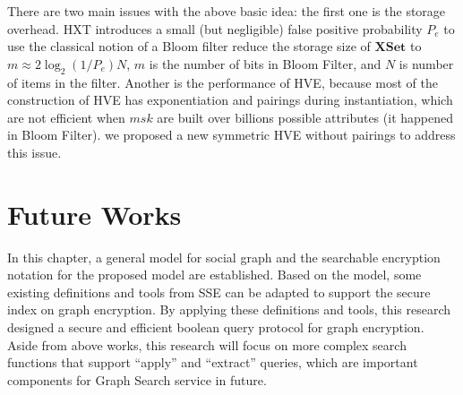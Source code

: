 There are two main issues with the above basic idea: the first one is the storage overhead. HXT introduces a small (but negligible) false positive probability $P_e$ to use the classical notion of a Bloom filter \cite{bloom1970space} reduce the storage size of $\mathbf{XSet}$ to $m \approx 2\log_2(1/P_e)N$, $m$ is the number of bits in Bloom Filter, and $N$ is number of items in the filter. Another is the performance of HVE, because most of the construction of HVE has exponentiation and pairings during instantiation, which are not efficient when $msk$ are built over billions possible attributes (it happened in Bloom Filter). we proposed a new symmetric HVE without pairings to address this issue.

\section{Future Works}
In this chapter, a general model for social graph and the searchable encryption notation for the proposed model are established. Based on the model, some existing definitions and tools from SSE can be adapted to support the secure index on graph encryption. By applying these definitions and tools, this research designed a secure and efficient boolean query protocol for graph encryption. Aside from above works, this research will focus on more complex search functions that support ``apply'' and ``extract'' queries, which are important components for Graph Search service in future.


